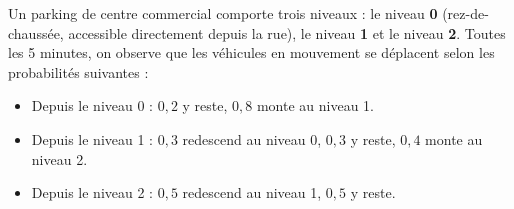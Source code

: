 \medskip

Un parking de centre commercial comporte trois niveaux : le niveau \textbf{0} (rez-de-chaussée, accessible directement depuis la rue), le niveau \textbf{1} et le niveau \textbf{2}. Toutes les 5 minutes, on observe que les véhicules en mouvement se déplacent selon les probabilités suivantes :

\medskip

\begin{itemize}[nosep]
  \item Depuis le niveau 0 : $0{,}2$ y reste, $0{,}8$ monte au niveau 1.
  \item Depuis le niveau 1 : $0{,}3$ redescend au niveau 0, $0{,}3$ y reste, $0{,}4$ monte au niveau 2.
  \item Depuis le niveau 2 : $0{,}5$ redescend au niveau 1, $0{,}5$ y reste.
\end{itemize}

